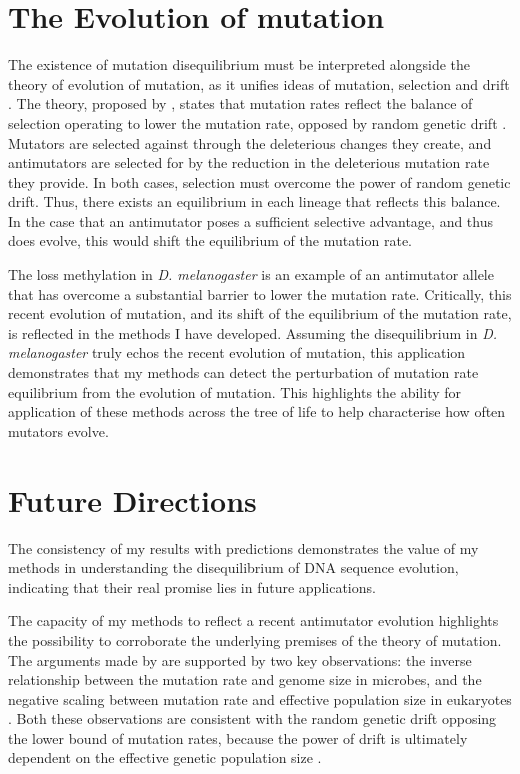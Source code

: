 \section{The Evolution of mutation}

The existence of mutation disequilibrium must be interpreted alongside the theory of evolution of mutation, as it unifies ideas of mutation, selection and drift \citep{Lynch2008TheEvolution, Lynch2010EvolutionRate}. The theory, proposed by \cite{Lynch2008TheEvolution}, states that mutation rates reflect the balance of selection operating to lower the mutation rate, opposed by random genetic drift \citep{Lynch2010EvolutionRate}. Mutators are selected against through the deleterious changes they create, and antimutators are selected for by the reduction in the deleterious mutation rate they provide. In both cases, selection must overcome the power of random genetic drift. Thus, there exists an equilibrium in each lineage that reflects this balance. In the case that an antimutator poses a sufficient selective advantage, and thus does evolve, this would shift the equilibrium of the mutation rate. 

The loss methylation in \textit{D. melanogaster} is an example of an antimutator allele that has overcome a substantial barrier to lower the mutation rate. Critically, this recent evolution of mutation, and its shift of the equilibrium of the mutation rate, is reflected in the methods I have developed. Assuming the disequilibrium in \textit{D. melanogaster} truly echos the recent evolution of mutation, this application demonstrates that my methods can detect the perturbation of mutation rate equilibrium from the evolution of mutation. This highlights the ability for application of these methods across the tree of life to help characterise how often mutators evolve. 

\section{Future Directions}

The consistency of my results with predictions demonstrates the value of my methods in understanding the disequilibrium of DNA sequence evolution, indicating that their real promise lies in future applications.

The capacity of my methods to reflect a recent antimutator evolution highlights the possibility to corroborate the underlying premises of the theory of mutation. The arguments made by \cite{Lynch2008TheEvolution, Lynch2010EvolutionRate} are supported by two key observations: the inverse relationship between the mutation rate and genome size in microbes, and the negative scaling between mutation rate and effective population size in eukaryotes \citep{Lynch2008TheEvolution, Lynch2010EvolutionRate}. Both these observations are consistent with the random genetic drift opposing the lower bound of mutation rates, because the power of drift is ultimately dependent on the effective genetic population size \citep{Lynch2008TheEvolution, Lynch2010EvolutionRate}. 

